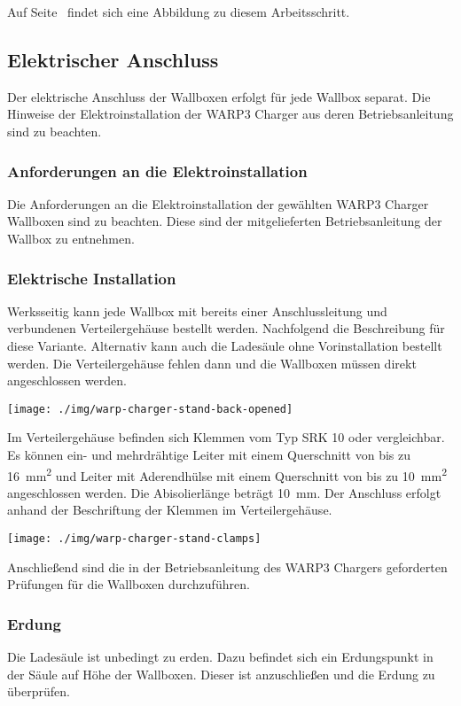 \documentclass[a4paper,10pt]{article}
\begin{document}
\begin{multicols*}{2}
	Auf Seite~\pageref{appendix_erection} findet sich eine
	Abbildung zu diesem Arbeitsschritt.

	\subsection{Elektrischer Anschluss}
	Der elektrische Anschluss der Wallboxen erfolgt für jede Wallbox separat.
	Die Hinweise der Elektroinstallation der WARP3 Charger aus deren
	Betriebsanleitung sind zu beachten.

	\subsubsection{Anforderungen an die Elektroinstallation}
	Die Anforderungen an die Elektroinstallation der gewählten WARP3
	Charger Wallboxen sind zu beachten. Diese sind der mitgelieferten
	Betriebsanleitung der Wallbox zu entnehmen.

	\subsubsection{Elektrische Installation}
	Werksseitig kann jede Wallbox mit bereits einer Anschlussleitung
	und verbundenen Verteilergehäuse bestellt werden. Nachfolgend die
	Beschreibung für diese Variante. Alternativ kann auch die Ladesäule ohne
	Vorinstallation bestellt werden. Die Verteilergehäuse fehlen dann und die
	Wallboxen müssen direkt angeschlossen werden.

	\begin{center}
		\texttt{[image: ./img/warp-charger-stand-back-opened]}
	\end{center}

	Im Verteilergehäuse befinden sich Klemmen vom Typ SRK 10
	oder vergleichbar. Es können ein- und mehrdrähtige Leiter mit einem Querschnitt von bis zu
	\SI{16}{\square\milli\meter} und Leiter mit Aderendhülse mit einem
	Querschnitt von bis zu \SI{10}{\square\milli\meter} angeschlossen werden.
	Die Abisolierlänge beträgt \SI{10}{\milli\meter}. Der Anschluss erfolgt
	anhand der Beschriftung der Klemmen im Verteilergehäuse.

	\texttt{[image: ./img/warp-charger-stand-clamps]}

	Anschließend sind die in der Betriebsanleitung des WARP3 Chargers geforderten Prüfungen für die
	Wallboxen durchzuführen.

	\subsubsection{Erdung}
	Die Ladesäule ist unbedingt zu erden. Dazu befindet sich ein Erdungspunkt in
	der Säule auf Höhe der Wallboxen. Dieser ist anzuschließen und die Erdung zu
	überprüfen.


\end{multicols*}
\end{document}
